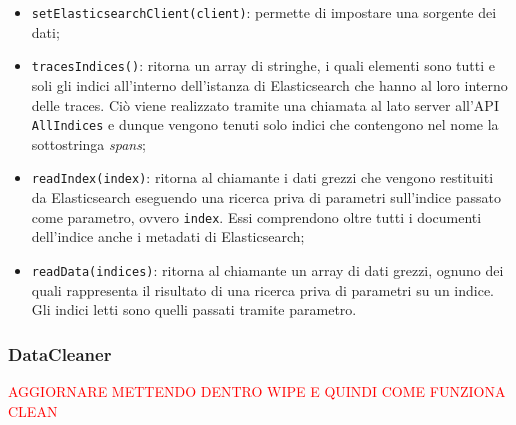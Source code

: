 \begin{itemize}
	\item \texttt{setElasticsearchClient(client)}: permette di impostare una sorgente dei dati;
	\item \texttt{tracesIndices()}: ritorna un array di stringhe, i quali elementi sono tutti e soli gli indici all'interno dell'istanza di Elasticsearch che hanno al loro interno delle traces. Ciò viene realizzato tramite una chiamata al lato server all'API \texttt{AllIndices} e dunque vengono tenuti solo indici che contengono nel nome la sottostringa \emph{spans};
	\item \texttt{readIndex(index)}: ritorna al chiamante i dati grezzi che vengono restituiti da Elasticsearch eseguendo una ricerca priva di parametri sull'indice passato come parametro, ovvero \texttt{index}. Essi comprendono oltre tutti i documenti dell'indice anche i metadati di Elasticsearch;
	\item \texttt{readData(indices)}: ritorna al chiamante un array di dati grezzi, ognuno dei quali rappresenta il risultato di una ricerca priva di parametri su un indice. Gli indici letti sono quelli passati tramite parametro.


\end{itemize}



\subsubsection{DataCleaner}

\textcolor{red}{AGGIORNARE METTENDO DENTRO WIPE E QUINDI COME FUNZIONA CLEAN}

